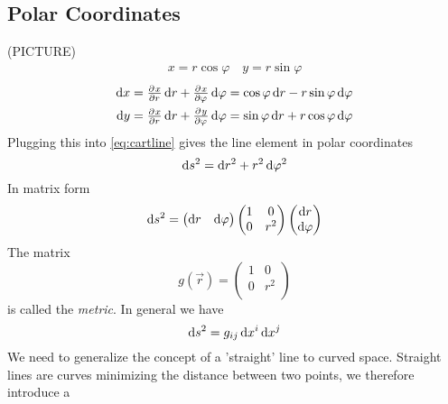 \subsection*{Polar Coordinates}
(PICTURE)
\begin{align*}
    x= r\cos\varphi\quad y= r\sin\varphi
\end{align*}
\begin{align*}
    \dif x&= \pd{x}{r}\dif r+\pd{x}{\varphi}\dif \varphi = \cos\varphi\dif r-r\sin\varphi\dif \varphi\\
    \dif y&= \pd{x}{r}\dif r+\pd{y}{\varphi}\dif \varphi = \sin\varphi\dif r+r\cos\varphi\dif \varphi
\end{align*}
Plugging this into \eqref{eq:cartline} gives the line element in polar coordinates
\begin{equation}
    \dif s^2=\dif r^2+r^2\dif \varphi^2
\end{equation}
In matrix form
\begin{equation}
    \dif s^2=
    \begin{pmatrix}
        \dif r& \dif \varphi
    \end{pmatrix}
    \begin{pmatrix}
        1& 0\\
        0& r^2\\
    \end{pmatrix}
    \begin{pmatrix}
        \dif r\\ \dif \varphi
    \end{pmatrix}
\end{equation}
The matrix
\begin{equation}
    g(\vec{r})=
    \begin{pmatrix}
        1& 0\\
        0& r^2\\
    \end{pmatrix}
\end{equation}
is called the \emph{metric}.
In general we have
\begin{equation}
    \dif s^2 = g_{ij}\dif x^i\dif x^j
\end{equation}
We need to generalize the concept of a 'straight' line to curved space. Straight lines are curves minimizing the distance between two points, 
we therefore introduce a

